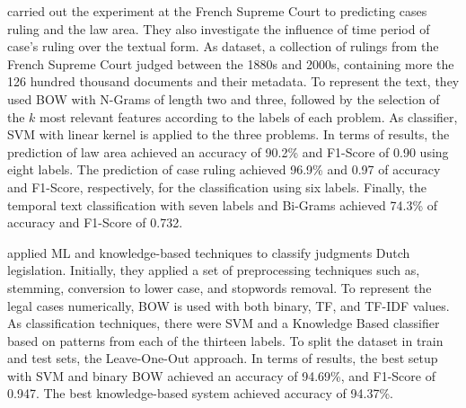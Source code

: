 
\textcite{Sulea2017} carried out the experiment at the French Supreme Court to predicting cases ruling and the law area. They also investigate the influence of time period of case's ruling over the textual form. As dataset, a collection of rulings from the French Supreme Court judged between the 1880s and 2000s, containing more the 126 hundred thousand documents and their metadata. To represent the text, they used \gls{BOW} with N-Grams of length two and three, followed by the selection of the $k$ most relevant features according to the labels of each problem. As classifier, \gls{SVM} with linear kernel is applied to the three problems. In terms of results, the prediction of law area achieved an accuracy of 90.2\% and F1-Score of 0.90 using eight labels. The prediction of case ruling achieved 96.9\% and 0.97 of accuracy and F1-Score, respectively, for the classification using six labels. Finally, the temporal text classification with seven labels and Bi-Grams achieved 74.3\% of accuracy and F1-Score of 0.732.

\textcite{Maat2010} applied \gls{ML} and knowledge-based techniques to classify judgments  Dutch legislation. Initially, they applied a set of preprocessing techniques such as, stemming, conversion to lower case, and stopwords removal. To represent the legal cases numerically, \gls{BOW} is used with both binary, \gls{TF}, and \gls{TF-IDF} values. As classification techniques, there were \gls{SVM} and a Knowledge Based classifier based on patterns from each of the thirteen labels. To split the dataset in train and test sets, the Leave-One-Out approach. In terms of results, the best setup with \gls{SVM} and binary \gls{BOW} achieved an accuracy of 94.69\%, and F1-Score of 0.947. The best  knowledge-based system achieved accuracy of 94.37\%.

